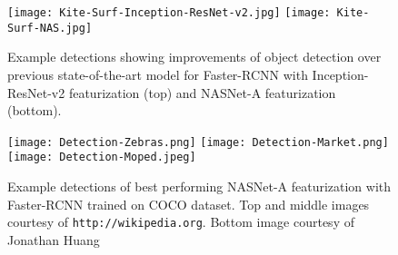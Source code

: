 \documentclass[10pt,twocolumn,letterpaper]{article}
\begin{document}
\iffalse\begin{figure}[h!]
\begin{center}
\texttt{[image: Kite-Surf-Inception-ResNet-v2.jpg]}
\hfill
\texttt{[image: Kite-Surf-NAS.jpg]}
\caption{Example detections showcasing improvements of object detection over previous state-of-the-art model for Faster-RCNN with Inception-ResNet-v2 featurization \cite{huang2016speed} (top)
and NASNet-A featurization (bottom).
}
\label{figure:object-detection}
\end{center}
\end{figure}\fi\begin{figure}[h!]
\begin{center}
\texttt{[image: Kite-Surf-Inception-ResNet-v2.jpg]}
\hfill
\texttt{[image: Kite-Surf-NAS.jpg]}
\caption{Example detections showing improvements of object detection over previous state-of-the-art model for Faster-RCNN with Inception-ResNet-v2 featurization \cite{huang2016speed} (top)
and NASNet-A featurization (bottom). %
}
\label{figure:object-detection}
\end{center}
\end{figure}\begin{figure}[h!]
\begin{center}
\texttt{[image: Detection-Zebras.png]}
\hfill
\texttt{[image: Detection-Market.png]}
\hfill
\texttt{[image: Detection-Moped.jpeg]}
\caption{Example detections of best performing NASNet-A featurization with Faster-RCNN trained on COCO dataset. Top and middle images courtesy of \texttt{http://wikipedia.org}. Bottom image courtesy of Jonathan Huang}
\label{figure:object-detection-examples}
\end{center}
\end{figure}
\end{document}
